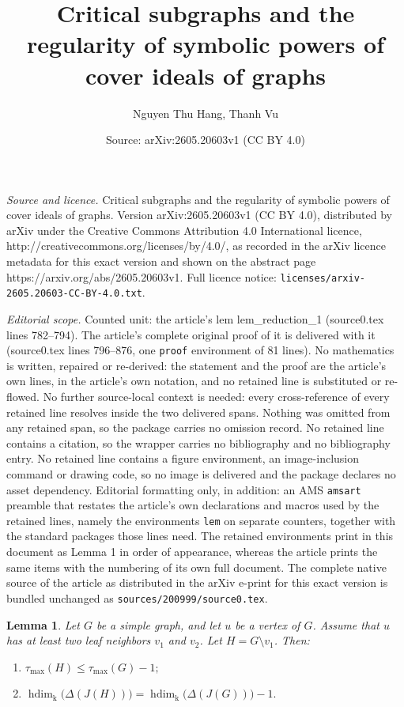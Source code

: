 \documentclass[10pt,a4paper]{amsart}
\title{Critical subgraphs and the regularity of symbolic powers of cover ideals of graphs}
\author{Nguyen Thu Hang, Thanh Vu}
\date{Source: arXiv:2605.20603v1 (CC BY 4.0)}
\newtheorem{lem}{Lemma}
\DeclareMathOperator{\hdim}{hdim}
\def\k {\mathrm k}
\begin{document}
\maketitle

\noindent\emph{Source and licence.} Critical subgraphs and the regularity of symbolic powers of cover ideals of graphs. Version arXiv:2605.20603v1 (CC BY 4.0), distributed by arXiv under the Creative Commons Attribution 4.0 International licence, http://creativecommons.org/licenses/by/4.0/, as recorded in the arXiv licence metadata for this exact version and shown on the abstract page https://arxiv.org/abs/2605.20603v1. Full licence notice: \texttt{licenses/arxiv-2605.20603-CC-BY-4.0.txt}.\par\smallskip

\noindent\textit{Editorial scope.} Counted unit: the article's lem lem\_reduction\_1 (source0.tex lines 782--794). The article's complete original proof of it is delivered with it (source0.tex lines 796--876, one \texttt{proof} environment of 81 lines). No mathematics is written, repaired or re-derived: the statement and the proof are the article's own lines, in the article's own notation, and no retained line is substituted or re-flowed.  No further source-local context is needed: every cross-reference of every retained line resolves inside the two delivered spans.  Nothing was omitted from any retained span, so the package carries no omission record.  No retained line contains a citation, so the wrapper carries no bibliography and no bibliography entry.  No retained line contains a figure environment, an image-inclusion command or drawing code, so no image is delivered and the package declares no asset dependency.  Editorial formatting only, in addition: an AMS \texttt{amsart} preamble that restates the article's own declarations and macros used by the retained lines, namely the environments \texttt{lem} on separate counters, together with the standard packages those lines need.  The retained environments print in this document as Lemma 1 in order of appearance, whereas the article prints the same items with the numbering of its own full document.  The complete native source of the article as distributed in the arXiv e-print for this exact version is bundled unchanged as \texttt{sources/200999/source0.tex}.
\begin{lem}\label{lem_reduction_1}
Let $G$ be a simple graph, and let $u$ be a vertex of $G$. Assume that $u$ has at least two leaf neighbors $v_1$ and $v_2$. Let $H = G \setminus v_1$. Then:
\begin{enumerate}
    \item
    \(    \tau_{\max}(H) \le \tau_{\max}(G) - 1;    \)
    
    \item
    \(    \hdim_{\k}\bigl(\Delta(J(H))\bigr)
    =
    \hdim_{\k}\bigl(\Delta(J(G))\bigr) - 1.
    \)
\end{enumerate}
\end{lem}
\end{document}
